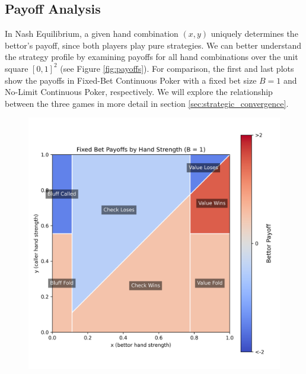 \documentclass[a4paper,12pt]{article}
\theoremstyle{plain}
\theoremstyle{definition}
\begin{document}
\subsection{Payoff Analysis}

In Nash Equilibrium, a given hand combination $(x, y)$ uniquely determines the bettor's payoff, since both players play pure strategies. We can better understand the strategy profile by examining payoffs for all hand combinations over the unit square $[0, 1]^2$ (see Figure \ref{fig:payoffs}). For comparison, the first and last plots show the payoffs in Fixed-Bet Continuous Poker with a fixed bet size $B=1$ and No-Limit Continuous Poker, respectively. We will explore the relationship between the three games in more detail in section \ref{sec:strategic_convergence}.

\begin{figure}[h!]
    \begin{adjustwidth}{-1in}{-1in}
        \centering
        \begin{minipage}{0.4\textwidth}
            \centering
            \includegraphics[width=\textwidth]{FixedBet_payoffs.png}
        \end{minipage}
        \hspace{0.02\textwidth}

\end{adjustwidth}
\end{figure}
\end{document}
